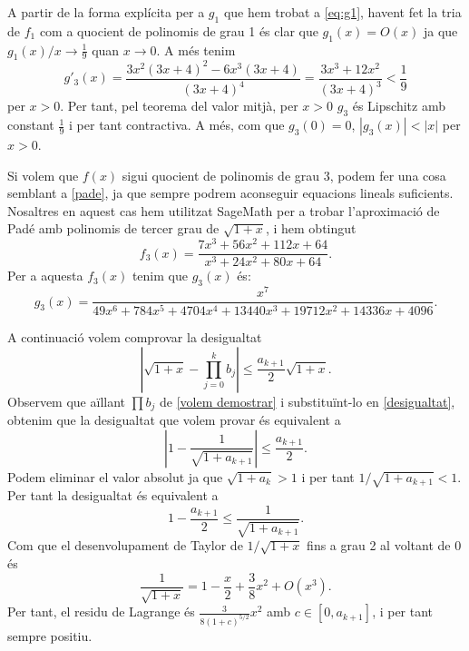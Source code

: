 \documentclass[12pt]{article}
\newcommand{\abs}[1]{\left\lvert#1\right\rvert}
\begin{document}
A partir de la forma explícita per a \( g_1 \) que hem trobat a \ref{eq:g1}, havent fet la tria de \( f_1 \) com a quocient de polinomis de grau 1 és clar que \( g_1(x) = O(x) \) ja que \( g_1(x) / x \to \frac{1}{9} \) quan \( x \to 0 \). A més tenim
\begin{equation*}
	g'_3(x) = \frac{3x^2(3x+4)^2 - 6x^3(3x+4)}{(3x+4)^4} = \frac{3x^3 + 12x^2}{(3x+4)^3} < \frac{1}{9}	
\end{equation*}
per \( x > 0 \). Per tant, pel teorema del valor mitjà, per \( x>0 \) \( g_3 \) és Lipschitz amb constant \( \frac{1}{9} \) i per tant contractiva. A més, com que \( g_3(0) = 0 \), \( \abs{g_3(x)} < \abs{x} \) per \( x > 0 \). 

Si volem que $f(x)$ sigui quocient de polinomis de grau 3, podem fer una cosa semblant a \eqref{pade}, ja que sempre podrem aconseguir equacions lineals suficients. Nosaltres en aquest cas hem utilitzat SageMath per a trobar l'aproximació de Padé amb polinomis de tercer grau de $\sqrt{1+x}$, i hem obtingut
\begin{equation*}
	f_3(x)=\dfrac{7x^3+56x^2+112x+64}{x^3+24x^2+80x+64}.
\end{equation*}
Per a aquesta $f_3(x)$ tenim que $g_3(x)$ és:
\begin{equation}\label{g3x}
	g_3(x)=\dfrac{x^7}{49x^6+784x^5+4704x^4+13440x^3+19712x^2+14336x+4096}.
\end{equation}

A continuació volem comprovar la desigualtat
\begin{equation}\label{desigualtat}
	\abs{\sqrt{1+x}-\prod_{j=0}^{k}b_j}\leq\frac{a_{k+1}}{2}\sqrt{1+x}.
\end{equation}
Observem que aïllant $\prod b_j$ de \eqref{volem demostrar} i substituïnt-lo en \eqref{desigualtat}, obtenim que la desigualtat que volem provar és equivalent a
\begin{equation}
	\left| 1-\dfrac{1}{\sqrt{1+a_{k+1}}}\right|\leq\dfrac{a_{k+1}}{2}.
\end{equation}
Podem eliminar el valor absolut ja que \( \sqrt{1 + a_k} > 1 \) i per tant $1/\sqrt{1+a_{k+1}}<1$. Per tant la desigualtat és equivalent a
\begin{equation}
	1-\dfrac{a_{k+1}}{2}\leq\dfrac{1}{\sqrt{1+a_{k+1}}}.
\end{equation}
Com que el desenvolupament de Taylor de $1/\sqrt{1+x}$ fins a grau 2 al voltant de 0 és
\begin{equation}
	\dfrac{1}{\sqrt{1+x}}=1-\dfrac{x}{2}+\frac{3}{8}x^2 + O(x^3).
\end{equation}
Per tant, el residu de Lagrange és \( \frac{3}{8(1 + c)^{5/2}}x^2 \) amb \( c \in [0, a_{k+1}] \), i per tant sempre positiu.
\end{document}
